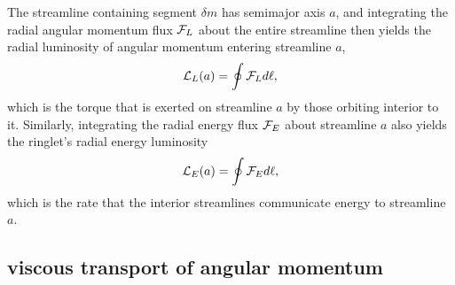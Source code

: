 \documentclass[preprint]{aastex62}
\begin{document}
The streamline containing segment $\delta m$ has semimajor axis $a$, and 
integrating the radial angular momentum flux ${\cal F}_L$ about the entire streamline
then yields the radial luminosity of angular momentum entering streamline $a$,
\begin{equation}
    \label{eqn:L_L}
    {\cal L}_L(a) = \oint {\cal F}_Ld\ell , 
\end{equation}
which is the torque that is exerted on streamline $a$ by those orbiting interior to it. Similarly,
integrating the radial energy flux ${\cal F}_E$ about streamline $a$ also yields the ringlet's radial energy luminosity
\begin{equation}
    \label{eqn:L_E}
    {\cal L}_E(a) = \oint {\cal F}_Ed\ell,
\end{equation}
which is the rate that the interior streamlines communicate energy to streamline $a$.

\subsection{viscous transport of angular momentum}
\label{subsec:viscous_flux}
\end{document}
